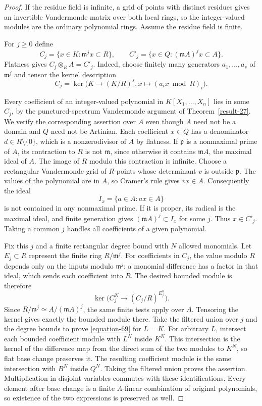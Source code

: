 \documentclass[11pt,a4paper]{article}
\theoremstyle{definition}
\begin{document}
\begin{proof}
If the residue field is infinite, a grid of points with
distinct residues gives an invertible Vandermonde
matrix over both local rings, so the integer-valued
modules are the ordinary polynomial rings. Assume
the residue field is finite.

For $j\ge0$ define
\[
 C_j=\{x\in K:\mathfrak m^jx\subset R\},\qquad
 C'_j=\{x\in Q:(\mathfrak m A)^jx\subset A\}.
\]
Flatness gives $C_j\otimes_R A=C'_j$.
Indeed, choose finitely many generators $a_1,\ldots,a_s$
of $\mathfrak m^j$ and tensor the kernel description
\[
 C_j=\ker\bigl(K\longrightarrow(K/R)^s,
                       x\longmapsto(a_ix\bmod R)_i\bigr).
\]

Every coefficient of an integer-valued polynomial in
$K[X_1,\ldots,X_n]$ lies in some $C_j$, by the
punctured-spectrum Vandermonde argument of Theorem~\ref{result-27}.
We verify the corresponding assertion over $A$ even
though $A$ need not be a domain and $Q$ need not be
Artinian. Each coefficient $x\in Q$ has a denominator
$d\in R\setminus\{0\}$, which is a nonzerodivisor
of $A$ by flatness. If $\mathfrak p$ is a nonmaximal
prime of $A$, its contraction to $R$ is not
$\mathfrak m$, since otherwise it contains
$\mathfrak m A$, the maximal ideal of $A$.
The image of $R$ modulo this contraction is infinite.
Choose a rectangular Vandermonde grid of $R$-points
whose determinant $v$ is outside $\mathfrak p$.
The values of the polynomial are in $A$, so Cramer's
rule gives $vx\in A$. Consequently the ideal
\[
                         I_x=\{a\in A:ax\in A\}
\]
is not contained in any nonmaximal prime. If it is
proper, its radical is the maximal ideal, and finite
generation gives $(\mathfrak m A)^j\subset I_x$
for some $j$. Thus $x\in C'_j$.
Taking a common $j$ handles all coefficients of a
given polynomial.

Fix this $j$ and a finite rectangular degree bound
with $N$ allowed monomials. Let $E_j\subset R$
represent the finite ring $R/\mathfrak m^j$.
For coefficients in $C_j$, the value modulo $R$
depends only on the inputs modulo $\mathfrak m^j$:
a monomial difference has a factor in that ideal,
which sends each coefficient into $R$.
The desired bounded module is therefore
\[
 \ker\bigl(C_j^N\longrightarrow(C_j/R)^{E_j^n}\bigr).
\]
Since $R/\mathfrak m^j\simeq A/(\mathfrak m A)^j$,
the same finite tests apply over $A$. Tensoring the
kernel gives exactly the bounded module there.
Take the filtered union over $j$ and the degree
bounds to prove \eqref{equation-69} for $L=K$.
For arbitrary $L$, intersect each bounded coefficient module with
$L^N$ inside $K^N$. This intersection is the kernel of the difference
map from the direct sum of the two modules to $K^N$, so flat base
change preserves it. The resulting coefficient module is the same
intersection with $B^N$ inside $Q^N$. Taking the filtered union proves
the assertion. Multiplication in disjoint variables commutes with these
identifications. Every element after base change is a finite
$A$-linear combination of original polynomials, so existence of the
two expressions is preserved as well.


\end{proof}
\end{document}
